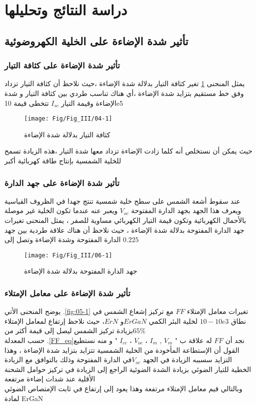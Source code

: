  \section{ دراسة النتائج وتحليلها }
 \subsection{ تأثير شدة الإضاءة على  الخلية الكهروضوئية   }
 \subsubsection{ تأثير  شدة الإضاءة على كثافة التيار}
 يمثل المنحنى  \ref{fig:current} تغير كثافة التيار بدلالة شدة الإضاءة ،حيث نلاحظ أن كثافة التيار تزداد وفق خط مستقيم بتزايد شدة الإضاءة ،أي هناك تناسب طردي بين كثافة التيار و شدة الإضاءة وقيمة التيار $ I_{sc} $ تتخطى قيمة  10e5
 \begin{figure}[h!]
 	\centering
 	\texttt{[image: Fig/Fig\_III/04-1]}
 	\caption{كثافة التيار بدلالة شدة الإضاءة}
 	\label{fig:current}
 \end{figure}
 \FloatBarrier
   حيث يمكن أن نستخلص أنه كلما زادت الإضاءة تزداد معها شدة التيار ،هذه الزيادة تسمح للخلية الشمسية بإنتاج طاقة كهربائية أكبر
 
 \subsubsection{ تأثير   شدة  الإضاءة على  جهد الدارة}
 عند سقوط أشعة الشمس على سطح  خلية شمسية تنتج جهدا في الظروف القياسية ويعرف هذا الجهد  بجهد الدارة المفتوحة $  V_{oc} $ ويعبر عنه عندما تكون الخلية غير موصلة بالأحمال الكهربائية وتكون قيمة التيار الكهربائي مساوية للصفر ،
 يمثل المنحنى تغيرات جهد الدارة المفتوحة بدلالة شدة الإضاءة ، حيث نلاحظ أن هناك علاقة طردية بين جهد الدارة المفتوحة وشدة الإضاءة وتصل إلى   $ 0.225 $ 
 \begin{figure}[h!]
 	\centering
 	\texttt{[image: Fig/Fig\_III/06-1]}
 	\caption{جهد الدارة المفتوحة بدلالة شدة الإضاءة}
 	\label{fig:06-1}
 \end{figure}
 
 \FloatBarrier
 
 \subsubsection{    تأثير   شدة الإضاءة على   معامل الإمتلاء}
 يوضح المنحنى الأتي .\ref{fig:05-1} تغيرات معامل الإمتلاء $ FF $ مع تركيز إشعاع الشمس في نطاق $ 10 -10e3  $ لخلية البئر الكمي $ ErGaN  $و $ ErN  $، حيث نلاحظ إرتفاع لمعامل الإمتلاء بزيادة تركيز الشمس ليصل إلى قيمة أكثر من$ 65\% $ \\
 حسب المعدلة .\ref{FF_eq}نجد أن $ FF $ له علاقة ب " $  V_m $ , $ I_m $ ، $ V_{oc} $ ، $  I_{cc}$ " و منه نستطيع القول 
 أن الإستطاعة المأخودة من الخلية الشمسية تتزايد بتزايد شدة الإضاءة ، وهذا التزايد سسببه الزيادة في الجهد $ V_{oc} $في الدارة المفتوحة وذلك بالتوافق مع الزيادة الخطية للتيار الضوئي بزيادة الشدة الضوئية الراجع إلى  الزيادة في تركيز  حوامل الشحنة الأقلية عند شدات إضاءة مرتفعة  \\
 وبالتالي قيم معامل الإمتلاء مرتفعة وهذا يعود إلى إرتفاع في ثابت الإمتصاص الضوئي لمادة ErGaN 
  
